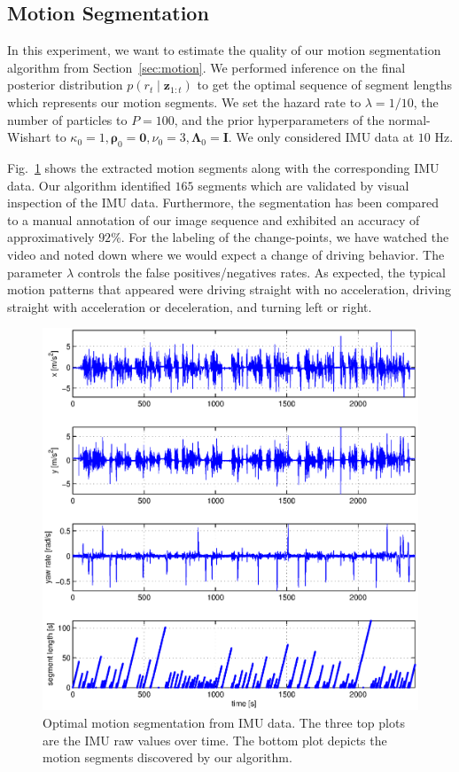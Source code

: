 \subsection{Motion Segmentation}
In this experiment, we want to estimate the quality of our motion segmentation
algorithm from Section~\ref{sec:motion}. We performed inference on the
final posterior distribution $p(r_t\mid \mathbf{z}_{1:t})$ to get the optimal
sequence of segment lengths which represents our motion segments. We set the
hazard rate to $\lambda=1/10$, the number of particles to $P=100$, and the prior
hyperparameters of the normal-Wishart to $\kappa_0=1,
\boldsymbol{\rho}_0=\mathbf{0},\nu_0=3,\boldsymbol{\Lambda}_0=\mathbf{I}$. We
only considered IMU data at $10$ Hz.

Fig.~\ref{fig:motion_segments} shows the extracted motion segments along with
the corresponding IMU data. Our algorithm identified $165$ segments which are
validated by visual inspection of the IMU data. Furthermore, the segmentation
has been compared to a manual annotation of our image sequence and exhibited an
accuracy of approximatively $92\%$. For the labeling of the change-points, we
have watched the video and noted down where we would expect a change of driving
behavior. The parameter $\lambda$ controls the false positives/negatives rates.
As expected, the typical motion patterns that appeared were driving straight
with no acceleration, driving straight with acceleration or deceleration, and
turning left or right.

\begin{figure}[t]
\centering
\includegraphics[width=\columnwidth]{fig/cpResult.eps}
\caption{Optimal motion segmentation from IMU data. The three top plots are the
IMU raw values over time. The bottom plot depicts the motion segments
discovered by our algorithm.}
\label{fig:motion_segments}
\end{figure}

